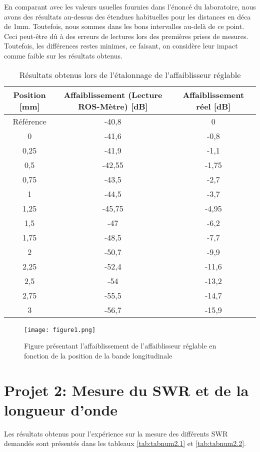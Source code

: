 En comparant avec les valeurs usuelles fournies dans l'énoncé du laboratoire, nous avons des résultats au-dessus des étendues habituelles pour les distances en déca de 1mm. Toutefois, nous sommes dans les bons intervalles au-delà de ce point. Ceci peut-être dû à des erreurs de lectures lors des premières prises de mesures. Toutefois, les différences restes minimes, ce faisant, on considère leur impact comme faible sur les résultats obtenus.
 \begin{table}[htbp]
  \centering
    \begin{tabular}{|c||c|c|} \hline
   Position [mm] & Affaiblissement (Lecture ROS-Mètre) [dB] & Affaiblissement réel [dB]\\ \hline \hline 
Référence & -40,8 & 0\\  
0 & -41,6 & -0,8\\ 
0,25 & -41,9 & -1,1\\ 
0,5 & -42,55 & -1,75\\ 
0,75 & -43,5 & -2,7\\ 
1 & -44,5 & -3,7\\ 
1,25 & -45,75 & -4,95\\ 
1,5 & -47 & -6,2\\ 
1,75 & -48,5 & -7,7\\ 
2 & -50,7 & -9,9\\ 
2,25 & -52,4 & -11,6\\ 
2,5 & -54 & -13,2\\ 
2,75 & -55,5 & -14,7\\ 
3 & -56,7 & -15,9\\ \hline 
    \end{tabular}%
      \caption{Résultats obtenus lors de l'étalonnage de l'affaiblisseur réglable}
  \label{tab:etalonnage_affaib}%
\end{table}%

\begin{figure}[htbp]
    \centering
    \texttt{[image: figure1.png]}
    \caption{Figure présentant l'affaiblissement de l'affaiblisseur réglable en fonction de la position de la bande longitudinale}
    \label{fig:affaiblissement}
\end{figure}

\section{Projet 2: Mesure du SWR et de la longueur d'onde}
Les résultats obtenus pour l'expérience sur la mesure des différents SWR demandés sont présentés dans les tableaux \ref{tab:tabnum2.1} et \ref{tab:tabnum2.2}.


